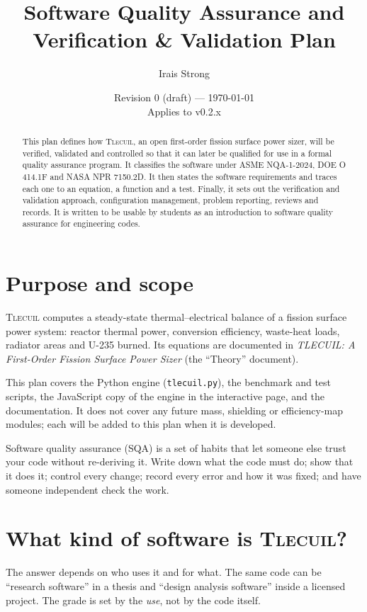 \documentclass[11pt]{article}
\title{\tlecuil{} Software Quality Assurance and\\Verification \& Validation Plan}
\author{Irais Strong}
\date{Revision 0 (draft) --- \today\\[4pt]\small Applies to \tlecuil{} v0.2.x}
\newcommand{\tlecuil}{\textsc{Tlecuil}}
\begin{document}
\maketitle

\begin{abstract}
This plan defines how \tlecuil{}, an open first-order fission surface power sizer, will be
verified, validated and controlled so that it can later be qualified for use in a formal
quality assurance program. It classifies the software under ASME NQA-1-2024, DOE O 414.1F
and NASA NPR 7150.2D. It then states the software requirements and traces each one to an
equation, a function and a test. Finally, it sets out the verification and validation
approach, configuration management, problem reporting, reviews and records. It is
written to be usable by students as an introduction to software quality assurance for
engineering codes.
\end{abstract}

\tableofcontents

\section{Purpose and scope}
\tlecuil{} computes a steady-state thermal--electrical balance of a fission surface power
system: reactor thermal power, conversion efficiency, waste-heat loads, radiator areas and
U-235 burned. Its equations are documented in \emph{TLECUIL: A First-Order Fission Surface
Power Sizer} (the ``Theory'' document).

This plan covers the Python engine (\texttt{tlecuil.py}), the benchmark and test
scripts, the JavaScript copy of the engine in the interactive page, and the
documentation. It does not cover any future mass, shielding or efficiency-map modules;
each will be added to this plan when it is developed.

\begin{plain}
Software quality assurance (SQA) is a set of habits that let someone else trust your
code without re-deriving it. Write down what the code must do; show that it does it;
control every change; record every error and how it was fixed; and have someone
independent check the work.
\end{plain}

\section{What kind of software is \tlecuil{}?}\label{sec:class}
The answer depends on who uses it and for what. The same code can be ``research
software'' in a thesis and ``design analysis software'' inside a licensed project. The
grade is set by the \emph{use}, not by the code itself.
\end{document}
